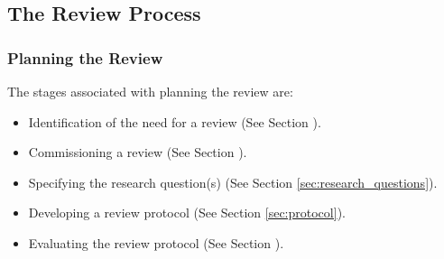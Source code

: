 
\subsection{The Review Process}

\subsubsection{Planning the Review}
The stages associated with planning the review are:
\begin{itemize}
    \item Identification of the need for a review (See Section ).
    \item Commissioning a review (See Section ).
    \item Specifying the research question(s) (See Section \ref{sec:research_questions}).
    \item Developing a review protocol (See Section \ref{sec:protocol}).
    \item Evaluating the review protocol (See Section ).
\end{itemize}

